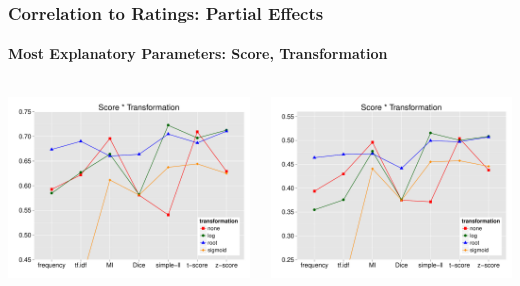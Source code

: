 \documentclass[t]{beamer} %
\begin{document}
\begin{frame}
  \frametitle{Correlation to Ratings: Partial Effects}
  \framesubtitle{Most Explanatory Parameters:  Score, Transformation} 
  
  \begin{columns}
    
    \begin{column}{0.5\textwidth}
      \centering
      \includegraphics[scale=0.30]{img/lapesa_rg_main_score_transformation}

      \gap[1]
    \end{column}


    \begin{column}{0.5\textwidth}
      \centering
      \includegraphics[scale=0.30]{img/lapesa_ws_main_score_transformation}
      
      \gap[1]

    \end{column}
  \end{columns}  
  
\end{frame}
\end{document}
